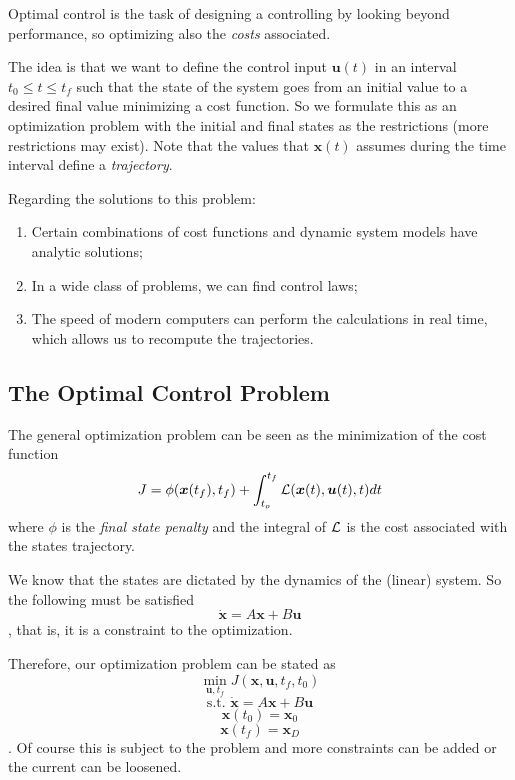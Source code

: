 Optimal control is the task of designing a controlling by looking beyond performance, so optimizing also the \emph{costs} associated.

The idea is that we want to define the control input  $\bm{u}(t)$ in an interval $t_0 \le t\le t_f$ such that the state of the system goes from an initial value to a desired final value minimizing a cost function. So we formulate this as an optimization problem with the initial and final states as the restrictions (more restrictions may exist). Note that the values that $\bm{x}(t)$ assumes during the time interval define a \emph{trajectory}.

Regarding the solutions to this problem:

\begin{enumerate}
    \item Certain combinations of cost functions and dynamic system models have analytic solutions;
    \item In a wide class of problems, we can find control laws;
    \item The speed of modern computers can perform the calculations in real time, which allows us to recompute the trajectories.
\end{enumerate}

\subsection*{The Optimal Control Problem}

The general optimization problem can be seen as the minimization of the cost function \[
J=\phi(\bm{x}(t_f),t_f) + \int_{t_o}^{t_f} \mathcal{L}(\bm{x}(t),\bm{u}(t),t)dt 
\] where $\phi$ is the \emph{final state penalty} and the integral of $\mathcal{L}$ is the cost associated with the states  trajectory.

We know that the states are dictated by the dynamics of the (linear) system. So the following must be satisfied \[
    \dot{\bm{x}} = A\bm{x} + B\bm{u}
\], that is, it is a constraint to the optimization.

Therefore, our optimization problem can be stated as \[
    \min_{\bm{u}, t_f} J(\bm{x},\bm{u},t_f,t_0)
\] \[
\textrm{s.t. } \dot{\bm{x}} = A\bm{x} + B\bm{u}
\] \[
\bm{x}(t_0) = \bm{x}_0
\] \[
\bm{x}(t_f) = \bm{x}_D
\]. Of course this is subject to the problem and more constraints can be added or the current can be loosened.


